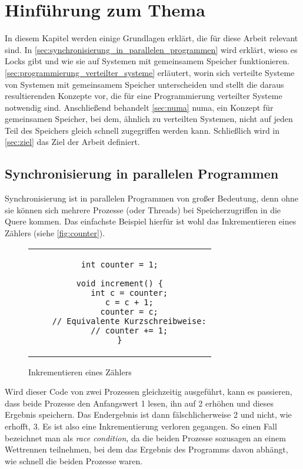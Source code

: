 \chapter{Hinführung zum Thema}
\label{ch:hinfuehrung}

In diesem Kapitel werden einige Grundlagen erklärt,
die für diese Arbeit relevant sind.
In \autoref{sec:synchronisierung_in_parallelen_programmen} wird erklärt,
wieso es Locks gibt
und wie sie auf Systemen mit gemeinsamem Speicher funktionieren.
\autoref{sec:programmierung_verteilter_systeme} erläutert,
worin sich verteilte Systeme von Systemen mit gemeinsamem Speicher unterscheiden
und stellt die daraus resultierenden Konzepte vor,
die für eine Programmierung verteilter Systeme notwendig sind.
Anschließend behandelt \autoref{sec:numa} \gls{numa},
ein Konzept für gemeinsamen Speicher,
bei dem,
ähnlich zu verteilten Systemen,
nicht auf jeden Teil des Speichers
gleich schnell zugegriffen werden kann.
Schließlich wird in \autoref{sec:ziel} das Ziel der Arbeit definiert.

\section{Synchronisierung in parallelen Programmen}
\label{sec:synchronisierung_in_parallelen_programmen}

Synchronisierung ist in parallelen Programmen von großer Bedeutung,
denn ohne sie können sich mehrere Prozesse (oder Threads) bei Speicherzugriffen in die Quere kommen.
Das einfachste Beispiel hierfür ist wohl das Inkrementieren eines Zählers (siehe \autoref{fig:counter}).

\begin{figure}[h]
    \centering
    \begin{tabular}{c}\begin{lstlisting}
int counter = 1;

void increment() {
    int c = counter;
    c = c + 1;
    counter = c;
    // Equivalente Kurzschreibweise:
    // counter += 1;
}
    \end{lstlisting}\end{tabular}
    \caption{Inkrementieren eines Zählers}
    \label{fig:counter}
\end{figure}

Wird dieser Code von zwei Prozessen gleichzeitig ausgeführt,
kann es passieren,
dass beide Prozesse den Anfangswert 1 lesen,
ihn auf 2 erhöhen und dieses Ergebnis speichern.
Das Endergebnis ist dann fälschlicherweise 2 und nicht, wie erhofft, 3.
Es ist also eine Inkrementierung verloren gegangen.
So einen Fall bezeichnet man als \textit{race condition},
da die beiden Prozesse sozusagen an einem Wettrennen teilnehmen,
bei dem das Ergebnis des Programms davon abhängt,
wie schnell die beiden Prozesse waren.

